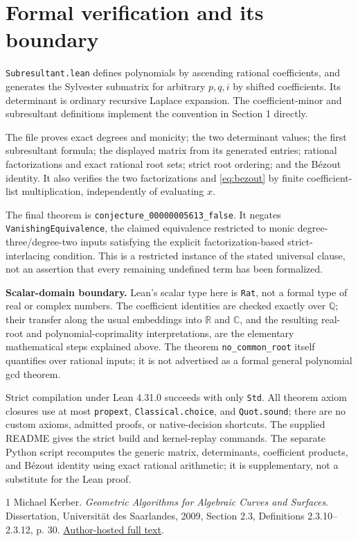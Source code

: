 \documentclass[11pt,letterpaper]{article}
\newcommand{\Q}{\mathbb Q}
\newcommand{\R}{\mathbb R}
\begin{document}
\newpage
\section{Formal verification and its boundary}
\texttt{Subresultant.lean} defines polynomials by ascending rational
coefficients, and generates the Sylvester submatrix for arbitrary
$p,q,i$ by shifted coefficients. Its determinant is ordinary recursive
Laplace expansion. The coefficient-minor and subresultant definitions
implement the convention in Section 1 directly.

The file proves exact degrees and monicity; the two determinant values;
the first subresultant formula; the displayed matrix from its generated
entries; rational factorizations and exact rational root sets; strict
root ordering; and the B\'ezout identity. It also verifies the two
factorizations and \eqref{eq:bezout} by finite coefficient-list
multiplication, independently of evaluating $x$.

The final theorem is \texttt{conjecture\_00000005613\_false}.
It negates \texttt{VanishingEquivalence}, the claimed equivalence restricted to
monic degree-three/degree-two inputs satisfying the explicit
factorization-based strict-interlacing condition. This is a restricted
instance of the stated universal clause, not an assertion that every
remaining undefined term has been formalized.

\textbf{Scalar-domain boundary.} Lean's scalar type here is
\texttt{Rat}, not a formal type of real or complex numbers. The
coefficient identities are checked exactly over $\Q$; their transfer
along the usual embeddings into $\R$ and $\mathbb C$, and the resulting
real-root and polynomial-coprimality interpretations, are the elementary
mathematical steps explained above. The theorem
\texttt{no\_common\_root} itself quantifies over rational inputs; it is
not advertised as a formal general polynomial gcd theorem.

Strict compilation under Lean 4.31.0 succeeds with only \texttt{Std}.
All theorem axiom closures use at most \texttt{propext},
\texttt{Classical.choice}, and \texttt{Quot.sound}; there are no custom
axioms, admitted proofs, or native-decision shortcuts.
The supplied README gives the strict build and kernel-replay commands.
The separate Python script recomputes the generic matrix, determinants,
coefficient products, and B\'ezout identity using exact rational
arithmetic; it is supplementary, not a substitute for the Lean proof.

\begin{thebibliography}{1}
Michael Kerber.
\emph{Geometric Algorithms for Algebraic Curves and Surfaces}.
Dissertation, Universit\"at des Saarlandes, 2009,
Section 2.3, Definitions 2.3.10--2.3.12, p. 30.
\href{https://www.geometrie.tugraz.at/kerber/kerber_papers/kerber_diss.pdf}{Author-hosted full text}.
\end{thebibliography}
\end{document}
